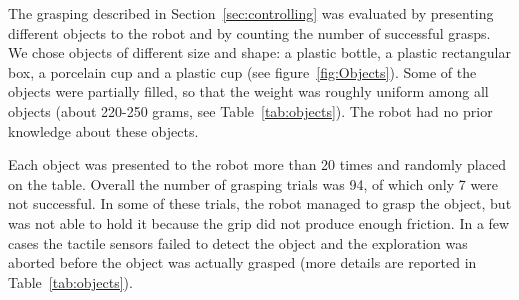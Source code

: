 

The grasping described in Section~\ref{sec:controlling} was
evaluated by presenting different objects to the robot and by
counting the number of successful grasps. We chose objects of
different size and shape: a plastic bottle, a plastic rectangular
box, a porcelain cup and a plastic cup (see
figure~\ref{fig:Objects}). Some of the objects were partially
filled, so that the weight was roughly uniform among all objects
(about 220-250 grams, see Table~\ref{tab:objects}). The robot had
no prior knowledge about these objects.

Each object was presented to the robot more than 20 times and
randomly placed on the table. Overall the number of grasping
trials was 94, of which only 7 were not successful. In some of
these trials, the robot managed to grasp the object, but was not
able to hold it because the grip did not produce enough friction.
In a few cases the tactile sensors failed to detect the object and
the exploration was aborted before the object was actually grasped
(more details are reported in Table~\ref{tab:objects}).

